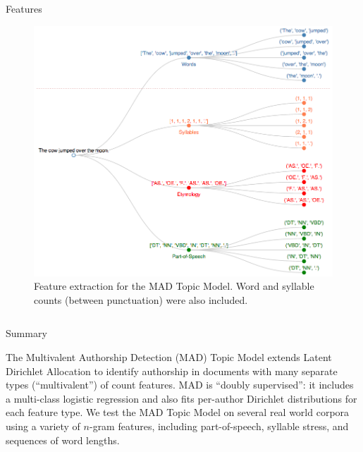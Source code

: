 \documentclass[final]{beamer}
\newlength{\onecolwid}
\newlength{\twocolwid}
\begin{document}
\begin{frame}[t]
\begin{columns}[t]
\begin{column}{\twocolwid}
\begin{columns}[t,totalwidth=\twocolwid]
\begin{column}{\onecolwid}
\begin{block}{Features}
\begin{figure}
\centering
\includegraphics[width=\linewidth]{dendrogram.png}
\caption{Feature extraction for the MAD Topic Model. Word and syllable counts (between punctuation) were also included.}
\end{figure}

\end{block}


\end{column} %

\end{columns} %

\vspace{-20mm}
\begin{alertblock}{Summary}

The Multivalent Authorship Detection (MAD) Topic Model extends Latent Dirichlet Allocation to identify authorship in documents with many separate types (``multivalent'') of count features. MAD is ``doubly supervised'': it includes a multi-class logistic regression and also fits per-author Dirichlet distributions for each feature type. We test the MAD Topic Model on several real world corpora using a variety of $n$-gram features, including part-of-speech, syllable stress, and sequences of word lengths.
\end{alertblock} 


\end{column}
\end{columns}
\end{frame}
\end{document}
